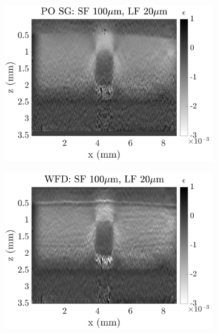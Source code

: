 \begin{figure}[h]
\begin{subfigure}{0.49\textwidth}
        \includegraphics[width=\textwidth]{appendix_figs/posg_fr100_lr20.png}
    \end{subfigure}
    \begin{subfigure}{0.49\textwidth}
    	\centering
        \includegraphics[width=\textwidth]{appendix_figs/wfd_fr100_lr20.png}
    \end{subfigure}
    \\
    \begin{subfigure}{0.49\textwidth}
    	\centering

\end{subfigure}
\end{figure}
